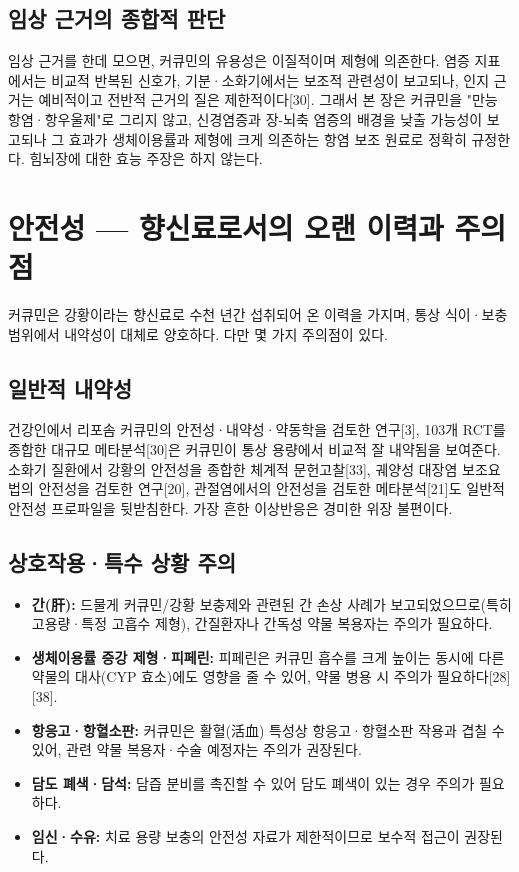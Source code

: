 \documentclass[12pt,oneside]{book}
\begin{document}
\subsection{임상 근거의 종합적 판단}

임상 근거를 한데 모으면, 커큐민의 유용성은 이질적이며 제형에 의존한다. 염증 지표에서는 비교적 반복된 신호가, 기분·소화기에서는 보조적 관련성이 보고되나, 인지 근거는 예비적이고 전반적 근거의 질은 제한적이다[30]. 그래서 본 장은 커큐민을 "만능 항염·항우울제"로 그리지 않고, 신경염증과 장-뇌축 염증의 배경을 낮출 가능성이 보고되나 그 효과가 생체이용률과 제형에 크게 의존하는 항염 보조 원료로 정확히 규정한다. 힘뇌장에 대한 효능 주장은 하지 않는다.

\section{안전성 — 향신료로서의 오랜 이력과 주의점}

커큐민은 강황이라는 향신료로 수천 년간 섭취되어 온 이력을 가지며, 통상 식이·보충 범위에서 내약성이 대체로 양호하다. 다만 몇 가지 주의점이 있다.

\subsection{일반적 내약성}

건강인에서 리포솜 커큐민의 안전성·내약성·약동학을 검토한 연구[3], 103개 RCT를 종합한 대규모 메타분석[30]은 커큐민이 통상 용량에서 비교적 잘 내약됨을 보여준다. 소화기 질환에서 강황의 안전성을 종합한 체계적 문헌고찰[33], 궤양성 대장염 보조요법의 안전성을 검토한 연구[20], 관절염에서의 안전성을 검토한 메타분석[21]도 일반적 안전성 프로파일을 뒷받침한다. 가장 흔한 이상반응은 경미한 위장 불편이다.

\subsection{상호작용·특수 상황 주의}

\begin{itemize}[leftmargin=6mm,itemsep=1pt,topsep=2pt]
  \item \textbf{간(肝):} 드물게 커큐민/강황 보충제와 관련된 간 손상 사례가 보고되었으므로(특히 고용량·특정 고흡수 제형), 간질환자나 간독성 약물 복용자는 주의가 필요하다.
  \item \textbf{생체이용률 증강 제형·피페린:} 피페린은 커큐민 흡수를 크게 높이는 동시에 다른 약물의 대사(CYP 효소)에도 영향을 줄 수 있어, 약물 병용 시 주의가 필요하다[28][38].
  \item \textbf{항응고·항혈소판:} 커큐민은 활혈(活血) 특성상 항응고·항혈소판 작용과 겹칠 수 있어, 관련 약물 복용자·수술 예정자는 주의가 권장된다.
  \item \textbf{담도 폐색·담석:} 담즙 분비를 촉진할 수 있어 담도 폐색이 있는 경우 주의가 필요하다.
  \item \textbf{임신·수유:} 치료 용량 보충의 안전성 자료가 제한적이므로 보수적 접근이 권장된다.
\end{itemize}
\end{document}
